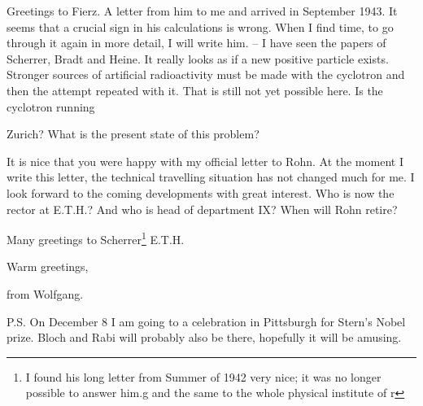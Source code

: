 Greetings to Fierz. A letter from him to me  and arrived in September 1943. It seems that a crucial sign in his calculations is wrong. When I find time, to go through it again in more detail, I will write him. -- I have seen the papers of Scherrer, Bradt and Heine. It really looks as if a new positive particle exists. Stronger sources of artificial radioactivity must be made with the cyclotron and then the attempt repeated with it. That is still not yet possible here. Is the cyclotron running 

 Zurich? What is the present state of this problem?
 
It is nice that you were happy with my official letter to Rohn. At the moment I write this letter, the technical travelling situation has not changed much for me. I look forward to the coming developments with great interest. Who is now the rector at E.T.H.? And who is head of department IX? When will Rohn retire?

Many greetings to Scherrer\footnote{I found his long letter from Summer of 1942 very nice; it was no longer possible to answer him.g and the same to the whole physical institute of r } E.T.H.

Warm greetings,

from Wolfgang.

P.S. On December 8 I am going to a celebration in Pittsburgh for Stern's Nobel prize. Bloch and Rabi will probably also be there, hopefully it will be amusing.%